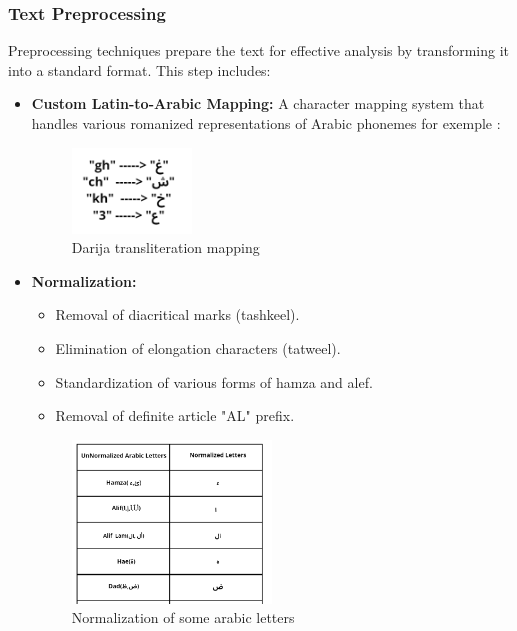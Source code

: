 \documentclass[a4paper,40pt,twocolumn]{article}
\begin{document}
\begin{itemize}
\subsubsection{Text Preprocessing}
Preprocessing techniques prepare the text for effective analysis by transforming it into a standard format. This step includes:

\begin{itemize}
    \item \textbf{Custom Latin-to-Arabic Mapping:} A character mapping system that handles various romanized representations of Arabic phonemes for exemple :
     \begin{figure}[h!]
    \hspace{0cm}
    \centering
    \includegraphics[width=0.3\textwidth]{traduction.png}
    \caption{Darija transliteration mapping}
    \label{fig:architecture}
\end{figure}
    
    \item \textbf{Normalization:} 
    \begin{itemize}
        \item Removal of diacritical marks (tashkeel).
        \item Elimination of elongation characters (tatweel).
        \item Standardization of various forms of hamza and alef.
        \item Removal of definite article "AL" prefix.
    \end{itemize}
 \begin{figure}[h!]
    \hspace{0cm}
    \centering
    \includegraphics[width=0.5\textwidth]{norm.png}
    \caption{Normalization of  some arabic letters}
    \label{fig:architecture}
\end{figure}
    

\end{itemize}
\end{itemize}
\end{document}
